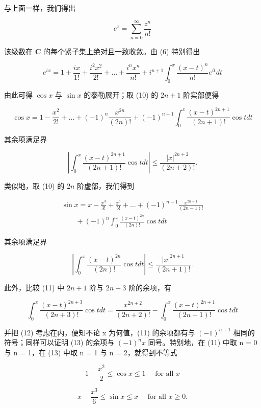 与上面一样，我们得出

\[
e ^ {z} = \sum_ {n = 0} ^ {\infty} \frac {z ^ {n}}{n !}\tag{9}
\]

该级数在 \(\mathbf{C}\) 的每个紧子集上绝对且一致收敛。由 (6) 特别得出

\[
e ^ {i x} = 1 + \frac {i x}{1 !} + \frac {i ^ {2} x ^ {2}}{2 !} + \dots + \frac {i ^ {n} x ^ {n}}{n !} + i ^ {n + 1} \int_ {0} ^ {x} \frac {(x - t) ^ {n}}{n !} e ^ {i t} d t\tag{10}
\]

由此可得 \(\cos x\) 与 \(\sin x\) 的泰勒展开；取 (10) 的 \(2n + 1\) 阶实部便得

\[
\cos x = 1 - \frac {x ^ {2}}{2 !} + \dots + (- 1) ^ {n} \frac {x ^ {2 n}}{(2 n) !} + (- 1) ^ {n + 1} \int_ {0} ^ {x} \frac {(x - t) ^ {2 n + 1}}{(2 n + 1) !} \cos t d t\tag{11}
\]

其余项满足界

\[
\left| \int_ {0} ^ {x} \frac {(x - t) ^ {2 n + 1}}{(2 n + 1) !} \cos t d t \right| \leqslant \frac {| x | ^ {2 n + 2}}{(2 n + 2) !}.\tag{12}
\]

类似地，取 (10) 的 \(2n\) 阶虚部，我们得到

\[
\begin{array}{l} \sin x = x - \frac {x ^ {3}}{3 !} + \frac {x ^ {5}}{5 !} + \dots + (- 1) ^ {n - 1} \frac {x ^ {2 n - 1}}{(2 n - 1) !} \\ \qquad + (- 1) ^ {n} \int_ {0} ^ {x} \frac {(x - t) ^ {2 n}}{(2 n) !} \cos t d t \end{array}\tag{13}
\]

其余项满足界

\[
\left| \int_ {0} ^ {x} \frac {(x - t) ^ {2 n}}{(2 n) !} \cos t d t \right| \leqslant \frac {| x | ^ {2 n + 1}}{(2 n + 1) !}.\tag{14}
\]

此外，比较 (11) 中 \(2n + 1\) 阶与 \(2n + 3\) 阶的余项，有

\[
\int_ {0} ^ {x} \frac {(x - t) ^ {2 n + 3}}{(2 n + 3) !} \cos t d t = \frac {x ^ {2 n + 2}}{(2 n + 2) !} - \int_ {0} ^ {x} \frac {(x - t) ^ {2 n + 1}}{(2 n + 1) !} \cos t d t
\]

并把 (12) 考虑在内，便知不论 x 为何值，(11) 的余项都有与 \((-1)^{n+1}\) 相同的符号；同样可以证明 (13) 的余项与 \((-1)^{n}x\) 同号。特别地，在 (11) 中取 n = 0 与 n = 1，在 (13) 中取 n = 1 与 n = 2，就得到不等式

\[
1 - \frac {x ^ {2}}{2} \leqslant \cos x \leqslant 1 \quad \text { for   all } x\tag{15}
\]

\[
x - \frac {x ^ {3}}{6} \leqslant \sin x \leqslant x \quad \text { for   all } x \geqslant 0.\tag{16}
\]

